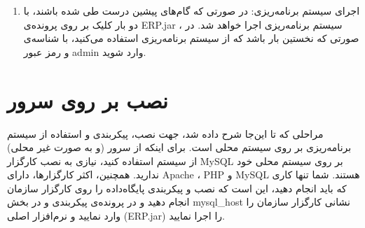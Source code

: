 \begin{enumerate}
	
	
	\item اجرای سیستم برنامه‌ریزی: 
در صورتی که گام‌های پیشین درست طی شده باشند، با دو بار کلیک بر روی پرونده‌ی ERP.jar ، سیستم برنامه‌ریزی اجرا خواهد شد. در صورتی که نخستین بار باشد که از سیستم برنامه‌ریزی استفاده می‌کنید، با  شناسه‌ی
  و رمز عبور admin وارد شوید. 
	
\end{enumerate}

\section{نصب بر روی سرور}
مراحلی که تا این‌جا شرح داده شد، جهت نصب، پیکربندی و استفاده از سیستم برنامه‌ریزی بر روی سیستم محلی است. برای اینکه از سرور (و به صورت غیر محلی) از سیستم استفاده کنید، نیازی به نصب کارگزار  MySQL بر روی سیستم محلی خود ندارید. همچنین، اکثر کارگزارها، دارای Apache ، PHP و  MySQL هستند. شما تنها کاری که باید انجام دهید، این است که نصب و پیکربندی پایگاه‌داده را روی کارگزار سازمان انجام دهید و در پرونده‌ی پیکربندی و در بخش  mysql\_host نشانی کارگزار سازمان را وارد نمایید و نرم‌افزار اصلی (ERP.jar) را اجرا نمایید.


